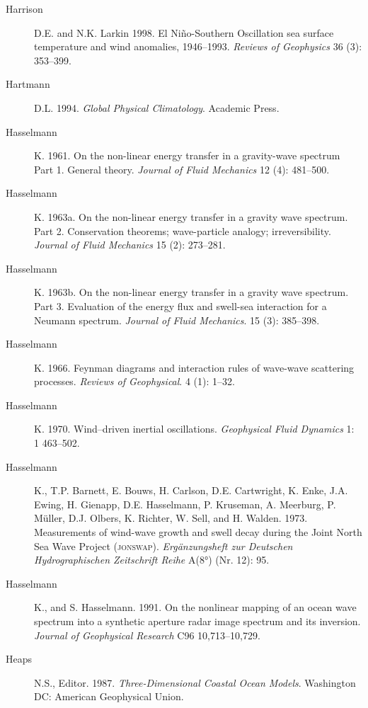 \begin{description}
\item [Harrison]D.E. and N.K. Larkin 1998. El Ni\~{n}o-Southern Oscillation sea surface temperature and wind anomalies, 1946--1993. \textit{Reviews of Geophysics} 36 (3): 353--399.

\item [Hartmann]D.L. 1994. \textit{Global Physical Climatology}.
Academic Press.

\item[Hasselmann]K. 1961. On the non-linear energy transfer in a gravity-wave
spectrum Part 1. General theory. \textit{Journal of Fluid Mechanics} 12 (4):
481--500.

\item[Hasselmann]K. 1963a. On the non-linear energy transfer in a gravity wave
spectrum. Part 2. Conservation theorems; wave-particle analogy; irreversibility.
\textit{Journal of Fluid Mechanics} 15 (2): 273--281.

\item[Hasselmann]K. 1963b. On the non-linear energy transfer in a gravity wave
spectrum. Part 3. Evaluation of the energy flux and swell-sea interaction for a
Neumann spectrum. \textit{Journal of Fluid Mechanics}. 15 (3): 385--398.

\item[Hasselmann]K. 1966. Feynman diagrams and interaction rules of wave-wave
scattering processes. \textit{Reviews of Geophysical}. 4 (1): 1--32.

\item [Hasselmann]K. 1970. Wind--driven inertial oscillations. \textit{Geophysical Fluid Dynamics} 1: 1 463--502.

\item [Hasselmann]K., T.P. Barnett, E. Bouws, H. Carlson, D.E. Cartwright, K.
Enke, J.A. Ewing, H. Gienapp, D.E. Hasselmann, P. Kruseman, A. Meerburg, P.
Müller, D.J. Olbers, K. Richter, W. Sell, and H. Walden. 1973. Measurements of
wind-wave growth and swell decay during the Joint North Sea Wave Project
(\textsc{jonswap}). \textit{Ergänzungsheft zur Deutschen Hydrographischen
Zeitschrift Reihe} A(8°) (Nr. 12): 95.

\item [Hasselmann]K., and S. Hasselmann. 1991. On the nonlinear mapping of an
ocean wave spectrum into a synthetic aperture radar image spectrum and its
inversion. \textit{Journal of Geophysical Research} C96 10,713--10,729.

\item [Heaps]N.S., Editor. 1987. \textit{Three-Dimensional Coastal Ocean Models}.
Washington DC: American Geophysical Union.


\end{description}
